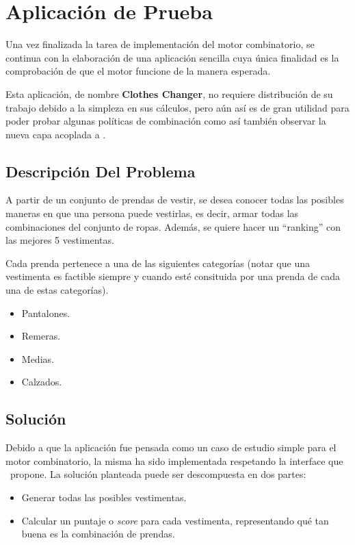 \chapter{Aplicaci\'on de Prueba}
Una vez finalizada la tarea de implementaci\'on del motor combinatorio, se continua con la elaboraci\'on de una aplicaci\'on sencilla cuya \'unica
finalidad es la comprobaci\'on de que el motor funcione de la manera esperada.

Esta aplicaci\'on, de nombre \textbf{Clothes Changer}, no requiere distribuci\'on de su trabajo debido a la simpleza en sus c\'alculos, pero a\'un as\'i es
de gran utilidad para poder probar algunas pol\'iticas de combinaci\'on como as\'i tambi\'en observar la nueva capa acoplada a \fud.

\section{Descripci\'on Del Problema}
A partir de un conjunto de prendas de vestir, se desea conocer todas las posibles maneras en que una persona puede vestirlas, es decir, armar todas
las combinaciones del conjunto de ropas. Adem\'as, se quiere hacer un ``ranking'' con las mejores 5 vestimentas.

Cada prenda pertenece a una de las siguientes categor\'ias (notar que una vestimenta es factible siempre y cuando est\'e consituida por una prenda de
cada una de estas categor\'ias).
\begin{itemize}
  \item Pantalones.
  \item Remeras.
  \item Medias.
  \item Calzados.
\end{itemize}

\section{Soluci\'on}
Debido a que la aplicaci\'on fue pensada como un caso de estudio simple para el motor combinatorio, la misma ha sido implementada respetando la interface
que \combeng \ propone. La soluci\'on planteada puede ser descompuesta en dos partes:
\begin{itemize}
  \item Generar todas las posibles vestimentas.
  \item Calcular un puntaje o \textit{score} para cada vestimenta, representando qu\'e tan buena es la combinaci\'on de prendas.
\end{itemize}

